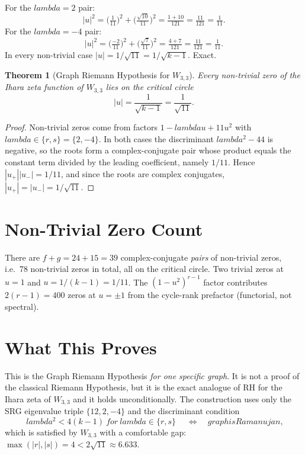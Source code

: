 \documentclass[12pt,a4paper]{article}
\def\textbf#1{#1}%
\def\text#1{#1}%
\def\lambda{lambda}%
\def\cdot{ }%
\newtheorem{theorem}{Theorem}[section]
\theoremstyle{definition}
\begin{document}
For the $\lambda=2$ pair:
\[
|u|^2 = \Big(\tfrac{1}{11}\Big)^2 + \Big(\tfrac{\sqrt{10}}{11}\Big)^2
= \tfrac{1+10}{121} = \tfrac{11}{121} = \tfrac{1}{11}.
\]
For the $\lambda=-4$ pair:
\[
|u|^2 = \Big(\tfrac{-2}{11}\Big)^2 + \Big(\tfrac{\sqrt{7}}{11}\Big)^2
= \tfrac{4+7}{121} = \tfrac{11}{121} = \tfrac{1}{11}.
\]
In every non-trivial case $|u| = 1/\sqrt{11} = 1/\sqrt{k-1}$. Exact.

\begin{theorem}[Graph Riemann Hypothesis for $W_{3,3}$]
\label{thm:GRH}
Every non-trivial zero of the Ihara zeta function of $W_{3,3}$ lies on
the critical circle
\[
|u| = \frac{1}{\sqrt{k-1}} = \frac{1}{\sqrt{11}}.
\]
\end{theorem}
\begin{proof}
Non-trivial zeros come from factors
$1 - \lambda u + 11 u^2$ with $\lambda\in\{r,s\}=\{2,-4\}$. In both cases
the discriminant $\lambda^2 - 44$ is negative, so the roots form a
complex-conjugate pair whose product equals the constant term divided
by the leading coefficient, namely $1/11$. Hence $|u_+|\cdot|u_-| = 1/11$,
and since the roots are complex conjugates, $|u_+|=|u_-|=1/\sqrt{11}$.
\end{proof}

\section*{Non-Trivial Zero Count}

There are $f + g = 24 + 15 = 39$ complex-conjugate \emph{pairs} of
non-trivial zeros, i.e.\ \textbf{78 non-trivial zeros} in total, all
on the critical circle. Two trivial zeros at $u=1$ and $u=1/(k-1)=1/11$.
The $(1-u^2)^{r-1}$ factor contributes $2(r-1)=400$ zeros at
$u=\pm 1$ from the cycle-rank prefactor (functorial, not spectral).

\section*{What This Proves}

This is the Graph Riemann Hypothesis \emph{for one specific graph}.
It is not a proof of the classical Riemann Hypothesis, but it is the
exact analogue of RH for the Ihara zeta of $W_{3,3}$ and it holds
unconditionally. The construction uses only the SRG eigenvalue triple
$\{12,2,-4\}$ and the discriminant condition
\[
\boxed{\;\lambda^2 < 4(k-1)\ \text{for}\ \lambda\in\{r,s\}\;}
\quad\Longleftrightarrow\quad
\text{graph is Ramanujan},
\]
which is satisfied by $W_{3,3}$ with a comfortable gap:
$\max(|r|,|s|)=4 < 2\sqrt{11}\approx 6.633$.
\end{document}

